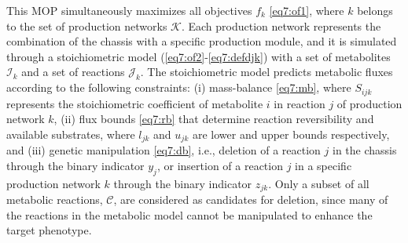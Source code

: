 This MOP simultaneously maximizes all objectives $f_k$ \eqref{eq7:of1}, where $k$ belongs to the set of production networks $\mathcal{K}$.
Each production network represents the combination of the chassis with a specific production module, and it is simulated through a stoichiometric model\citep{palsson2015} (\ref{eq7:of2}-\ref{eq7:defdjk}) with a set of metabolites $\mathcal{I}_k$ and a set of reactions $\mathcal{J}_k$.
The stoichiometric model predicts metabolic fluxes according to the following constraints:
(i) mass-balance \eqref{eq7:mb}, where $S_{ijk}$ represents the stoichiometric coefficient of metabolite $i$ in reaction $j$ of production network $k$, (ii) flux bounds \eqref{eq7:rb} that determine reaction reversibility and available substrates, where $l_{jk}$ and $u_{jk}$ are lower and upper bounds respectively, and (iii) genetic manipulation \eqref{eq7:db}, i.e., deletion of a reaction $j$ in the chassis through the binary indicator $y_{j}$, or insertion of a reaction $j$ in a specific production network $k$ through the binary indicator $z_{jk}$.
Only a subset of all metabolic reactions, $\mathcal{C}$, are considered as candidates for deletion, since many of the reactions in the metabolic model cannot be manipulated to enhance the target phenotype.

